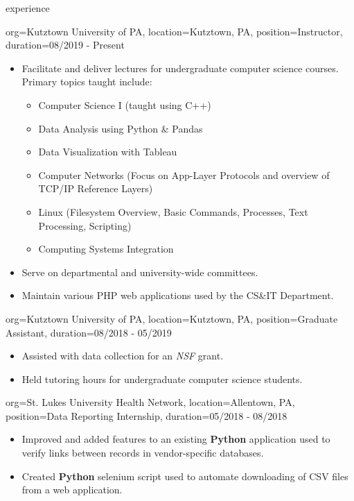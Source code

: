 \documentclass{resume}
\begin{document}
\makeheader

\begin{ResumeSection}{experience}
    \begin{ResumeSubsection}{org={Kutztown University of PA}, location={Kutztown, PA}, position={Instructor}, duration={08/2019 - Present}}
        \begin{itemize}
            \item Facilitate and deliver lectures for undergraduate computer science courses. Primary topics taught include: 
            \begin{itemize}
                \item Computer Science I (taught using C++)
                \item Data Analysis using Python \& Pandas
                \item Data Visualization with Tableau
                \item Computer Networks (Focus on App-Layer Protocols and overview of TCP/IP Reference Layers)
                \item Linux (Filesystem Overview, Basic Commands, Processes, Text Processing, Scripting)
                \item Computing Systems Integration
            \end{itemize}
            \item Serve on departmental and university-wide committees.
            \item Maintain various PHP web applications used by the CS\&IT Department.
        \end{itemize}
    \end{ResumeSubsection}    
    \begin{ResumeSubsection}{org={Kutztown University of PA}, location={Kutztown, PA}, position={Graduate Assistant}, duration={08/2018 - 05/2019}}
        \begin{itemize}
            \item Assisted with data collection for an \emph{NSF} grant.
            \item Held tutoring hours for undergraduate computer science students. 
        \end{itemize}
    \end{ResumeSubsection}
    \begin{ResumeSubsection}{org={St. Lukes University Health Network}, location={Allentown, PA}, position={Data Reporting Internship}, duration={05/2018 - 08/2018}}
        \begin{itemize}
            \item Improved and added features to an existing \textbf{Python} application used to verify links between records in vendor-specific databases. 
            \item Created \textbf{Python} selenium script used to automate downloading of CSV files from a web application.
        \end{itemize}
    \end{ResumeSubsection}
\end{ResumeSection}
\end{document}

